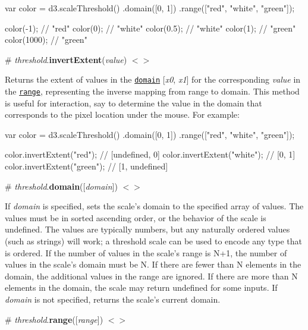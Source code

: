 \begin{DoxyCode}
var color = d3.scaleThreshold()
    .domain([0, 1])
    .range(["red", "white", "green"]);

color(-1);   // "red"
color(0);    // "white"
color(0.5);  // "white"
color(1);    // "green"
color(1000); // "green"
\end{DoxyCode}


\label{_threshold_invertExtent}%
\# {\itshape threshold}.{\bfseries invert\+Extent}({\itshape value}) \href{https://github.com/d3/d3-scale/blob/master/src/threshold.js#L21}{\tt $<$$>$}

Returns the extent of values in the \href{#threshold_domain}{\tt domain} \mbox{[}{\itshape x0}, {\itshape x1}\mbox{]} for the corresponding {\itshape value} in the \href{#threshold_range}{\tt range}, representing the inverse mapping from range to domain. This method is useful for interaction, say to determine the value in the domain that corresponds to the pixel location under the mouse. For example\+:


\begin{DoxyCode}
var color = d3.scaleThreshold()
    .domain([0, 1])
    .range(["red", "white", "green"]);

color.invertExtent("red"); // [undefined, 0]
color.invertExtent("white"); // [0, 1]
color.invertExtent("green"); // [1, undefined]
\end{DoxyCode}


\label{_threshold_domain}%
\# {\itshape threshold}.{\bfseries domain}(\mbox{[}{\itshape domain}\mbox{]}) \href{https://github.com/d3/d3-scale/blob/master/src/threshold.js#L13}{\tt $<$$>$}

If {\itshape domain} is specified, sets the scale’s domain to the specified array of values. The values must be in sorted ascending order, or the behavior of the scale is undefined. The values are typically numbers, but any naturally ordered values (such as strings) will work; a threshold scale can be used to encode any type that is ordered. If the number of values in the scale’s range is N+1, the number of values in the scale’s domain must be N. If there are fewer than N elements in the domain, the additional values in the range are ignored. If there are more than N elements in the domain, the scale may return undefined for some inputs. If {\itshape domain} is not specified, returns the scale’s current domain.

\label{_threshold_range}%
\# {\itshape threshold}.{\bfseries range}(\mbox{[}{\itshape range}\mbox{]}) \href{https://github.com/d3/d3-scale/blob/master/src/threshold.js#L17}{\tt $<$$>$}

